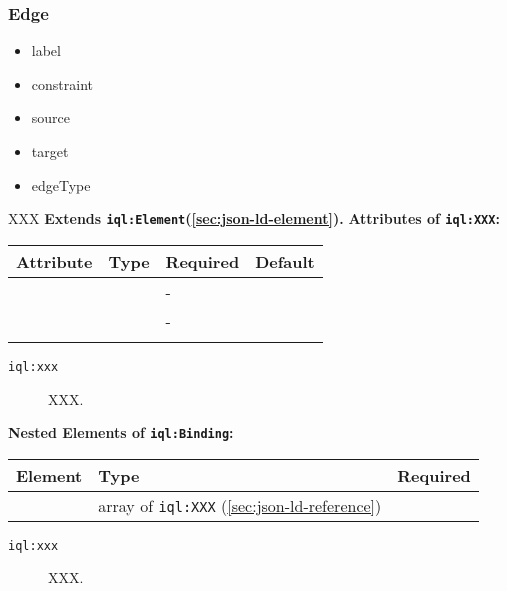 \documentclass[11pt]{article}
\newcommand{\iqlns}{iql:}
\newcommand{\iqlType}[1]{\texttt{\iqlns#1}}
\newcommand{\attributes}[1]{\noindent\textbf{Attributes of \iqlType{#1}:}\newline\medskip}
\newcommand{\elements}[1]{\noindent\textbf{Nested Elements of \iqlType{#1}:}\newline\medskip}
\newcommand{\desc}[1]{\noindent#1\newline\medskip}
\newcommand{\extends}[2]{\noindent\textbf{Extends \iqlType{#1}(#2).}\newline\medskip}
\begin{document}
\subsubsection{Edge}
\label{sec:json-ld-edge}
\begin{itemize}
\item label
\item constraint
\item source
\item target
\item edgeType
\end{itemize}
\desc{XXX}
\extends{Element}{\ref{sec:json-ld-element}}
\attributes{XXX}
\begin{tabular}{|p{}|p{}|p{}|p{}|}
	\hline
	\textbf{Attribute} & \textbf{Type} & \textbf{Required} & \textbf{Default} \\ 
	\hline
	\hline
	&  & - &  \\ 
	\hline 
	&  & - &  \\ 
	\hline 
	&  &  & \\ 
	\hline 
\end{tabular}
\begin{description}
	\item[\iqlType{xxx}] XXX.
\end{description}
\elements{Binding}
\begin{tabular}{|p{}|p{}|p{}|}
	\hline
	\textbf{Element} & \textbf{Type} & \textbf{Required} \\ 
	\hline
	\hline 
	& array of \iqlType{XXX} (\ref{sec:json-ld-reference}) &  \\ 
	\hline 
\end{tabular}
\begin{description}
	\item[\iqlType{xxx}] XXX.
\end{description}

\end{document}
